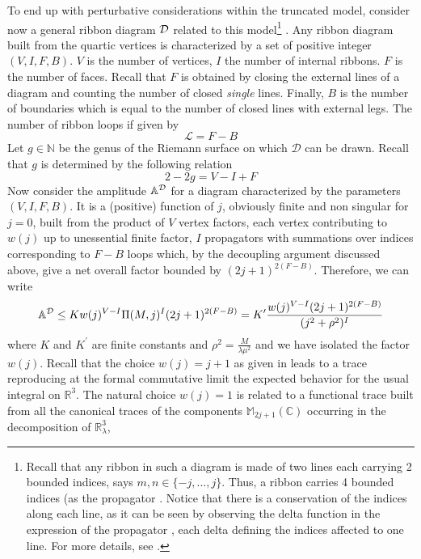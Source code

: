 \documentclass[10pt]{book}
\theoremstyle{break}
\begin{document}
To end up with perturbative considerations within the truncated model, consider now a general ribbon diagram ${\cal{D}}$ related to this model\footnote{Recall that any ribbon in such a diagram is made of two lines each carrying 2 bounded indices, says $m,n\in\{-j,...,j \}$. Thus, a ribbon carries 4 bounded indices (as the propagator %
. Notice that there is a conservation of the indices along each line, as it can be seen by observing the delta function in the expression of the propagator %
, each delta defining the indices affected to one line. For more details, see %
.}
. Any ribbon diagram built from the quartic vertices is characterized by a set of positive integer $(V,I,F,B)$. $V$ is the number of vertices, $I$ the number of internal ribbons. $F$ is the number of faces. Recall that $F$ is obtained by closing the external lines of a diagram and counting the number of closed {\it{single}} lines. Finally, $B$ is the number of boundaries which is equal to the number of closed lines with external legs. The number of ribbon loops if given by
\begin{equation*}
\mathcal{L}=F-B %
\end{equation*}
Let $g\in\mathbb{N}$ be the genus of the Riemann surface on which $\mathcal{D}$ can be drawn. Recall that $g$ is determined by the following relation
\begin{equation*}
2-2g=V-I+F %
\end{equation*}
Now consider the amplitude ${\mathbb{A}}^{\cal{D}}$ for a diagram characterized by the parameters $(V,I,F,B)$. It is a (positive) function of $j$, obviously finite and non singular for $j=0$, built from the product of $V$ vertex factors, each vertex contributing to $w(j)$ up to unessential finite factor, $I$ propagators %
with summations over indices corresponding to $F-B$ loops which, by the decoupling argument discussed above, give a net overall factor bounded by $(2j+1)^{2(F-B)}$. Therefore, we can write
\begin{equation*}
{\mathbb{A}}^{\cal{D}}\le Kw(j)^{V-I}\Pi(M,j)^{I}(2j+1)^{2(F-B)}=K^\prime\frac{w(j)^{V-I}(2j+1)^{2(F-B)}}{(j^2+\rho^2)^I}%
\end{equation*}
where $K$ and $K^\prime$ are finite constants and $\rho^2=\frac{M}{\lambda\mu^2}$ and we have isolated the factor $w(j)$. Recall that the choice $w(j)=j+1$ as given in %
leads to a trace reproducing at the formal commutative limit the expected behavior for the usual integral on $\mathbb{R}^3$. The natural choice $w(j)=1$ is related to a functional trace built from all the canonical traces of the components $\mathbb{M}_{2j+1}(\mathbb{C})$ occurring in the decomposition of $\mathbb{R}^3_\lambda$, %
\end{document}
